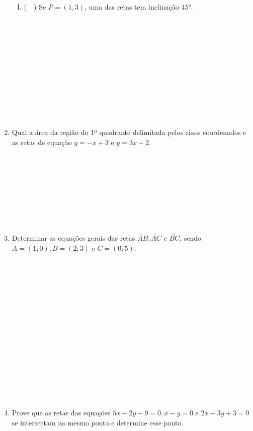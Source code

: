 \documentclass[a4paper,14pt]{article}
\begin{document}
\begin{multicols}{2}
\begin{enumerate}
\begin{enumerate}[I.]
				\item (~~) Se $P = (1, 3)$, uma das retas tem inclinação 45°. \\\\\\\\\\\\\\\\\\\\\\\\
			\end{enumerate}
			\item Qual a área da região do 1º quadrante delimitada pelos eixos coordenados e as retas de equação $y = -x + 3$ e $y = 3x + 2$. \\\\\\\\\\\\\\\\\\
			\item Determinar as equações gerais das retas $ \overleftrightarrow{AB}, \overleftrightarrow{AC}$ e $\overleftrightarrow{BC}$, sendo $A = (1; 0), B = (2; 3)$ e $C = (0; 5)$. \\\\\\\\\\\\\\\\\\\\\\\\\\\\\\\\
			\item Prove que as retas das equações $5x - 2y - 9 = 0, x - y = 0$ e $2x - 3y + 3 = 0$ se intersectam no mesmo ponto e determine esse ponto.  \\\\\\\\\\\\\\\\\\\\\\\\\\\\\\

\end{enumerate}
\end{multicols}
\end{document}
